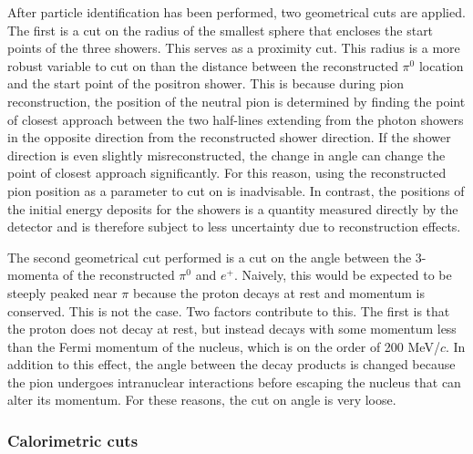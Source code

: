 \documentclass[a4paper, 10pt]{article}
\begin{document}
After particle identification has been performed, two geometrical cuts are applied. The first is a cut on the radius of the smallest sphere that encloses the start points of the three showers. This serves as a proximity cut. This radius is a more robust variable to cut on than the distance between the reconstructed $\pi^{0}$ location and the start point of the positron shower. This is because during pion reconstruction, the position of the neutral pion is determined by finding the point of closest approach between the two half-lines extending from the photon showers in the opposite direction from the reconstructed shower direction. If the shower direction is even slightly misreconstructed, the change in angle can change the point of closest approach significantly. For this reason, using the reconstructed pion position as a parameter to cut on is inadvisable. In contrast, the positions of the initial energy deposits for the showers is a quantity measured directly by the detector and is therefore subject to less uncertainty due to reconstruction effects.

The second geometrical cut performed is a cut on the angle between the 3-momenta of the reconstructed $\pi^{0}$ and $e^{+}$. Naively, this would be expected to be steeply peaked near $\pi$ because the proton decays at rest and momentum is conserved. This is not the case. Two factors contribute to this. The first is that the proton does not decay at rest, but instead decays with some momentum less than the Fermi momentum of the nucleus, which is on the order of 200 MeV/$c$.  In addition to this effect, the angle between the decay products is changed because the pion undergoes intranuclear interactions before escaping the nucleus that can alter its momentum. For these reasons, the cut on angle is very loose.


\subsubsection{Calorimetric cuts}
\end{document}
